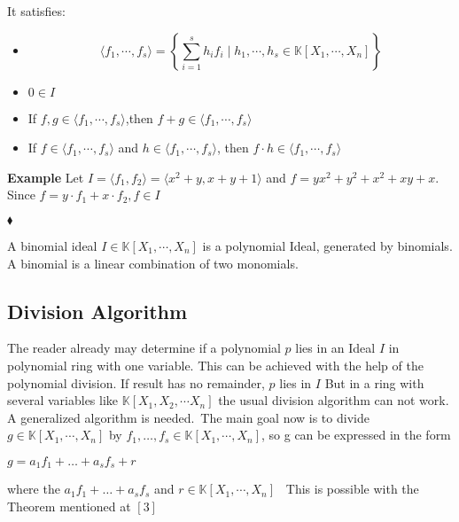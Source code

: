 It satisfies: \\
\begin{center}

\begin{itemize}
\item
\[ \langle f_{1}, \cdots , f_{s} \rangle = \left\lbrace  \sum_{i=1}^s h_{i}f_{i} \mid h_{1}, \cdots , h_{s} \in \mathbb{K}\left[X_{1}, \cdots, X_{n}\right] \right\rbrace \]
\item
$0 \in I$ 
\item
If $f,g \in \langle f_{1}, \cdots , f_{s} \rangle$,then  $f+g \in \langle f_{1}, \cdots , f_{s} \rangle$ 
\item
If $f \in \langle f_{1}, \cdots , f_{s} \rangle$ and $h \in  \langle f_{1}, \cdots , f_{s} \rangle$, then $f \cdot h \in \langle f_{1}, \cdots , f_{s} \rangle$
\end{itemize}

\end{center}




\textbf{Example} Let $ I= \langle f_{1},f_{2} \rangle = \langle x^{2}+y, x+y+1 \rangle $ and $f=yx^{2}+y^{2}+x^{2}+xy+x$. Since $f= y \cdot f_{1} + x \cdot f_{2}, f\in I$ \begin{flushright}
$\blacklozenge$
\end{flushright} 



\begin{env_definition}
A binomial ideal $ I \in \mathbb{K}\left[X_{1}, \cdots, X_{n}\right]$ is a polynomial Ideal, generated by binomials. A binomial is a linear combination of two monomials.

\end{env_definition}

\subsection{Division Algorithm}

The reader already may determine if a polynomial $p$ lies in an Ideal $I$ in polynomial ring with one variable. This can be achieved with the help of the polynomial division.
If result has no remainder, $p$ lies in $I$
But in a ring with several variables like $ \mathbb{K} \left[X_{1},X_{2},\cdots X_{n}\right] $ the usual division algorithm can not work. A generalized algorithm is needed.\
The main goal now is to divide $g \in \mathbb{K}\left[X_{1}, \cdots, X_{n}\right] $ by 
$f_{1}, \ldots, f_{s} \in \mathbb{K}\left[X_{1}, \cdots, X_{n}\right]$, so g can be expressed in the form \begin{center}
$g = a_{1}f_{1}+ \ldots + a_{s}f_{s} +r$
\end{center} 
where the $a_{1}f_{1}+ \ldots + a_{s}f_{s} $ and $r \in \mathbb{K}\left[X_{1}, \cdots, X_{n}\right]$ \
This is possible with the Theorem mentioned at  $\left[ 3\right] $


